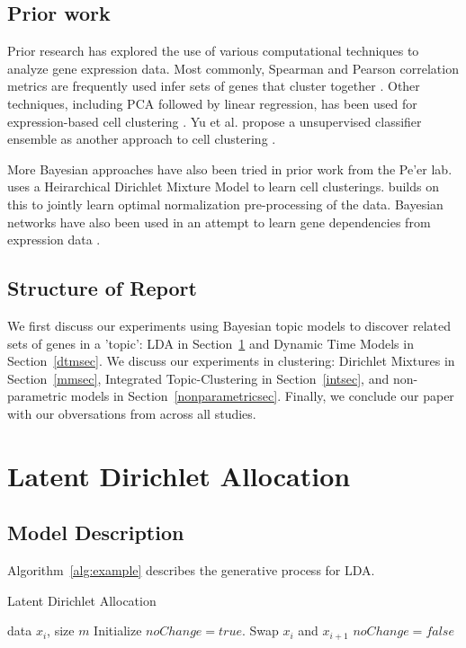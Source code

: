 \documentclass{article}
\begin{document}
\subsection{Prior work}
Prior research has explored the use of various computational techniques to analyze gene expression data. Most commonly, Spearman and Pearson correlation metrics are frequently used infer sets of genes that cluster together \cite{profiling, nature}. Other techniques, including PCA followed by linear regression, has been used for expression-based cell clustering \cite{transcriptomics}. Yu et al. propose a unsupervised classifier ensemble as another approach to cell clustering \cite{consensus}. 

More Bayesian approaches have also been tried in prior work from the Pe'er lab. \cite{bayesge2} uses a Heirarchical Dirichlet Mixture Model to learn cell clusterings. \cite{bayesge1} builds on this to jointly learn optimal normalization pre-processing of the data. Bayesian networks have also been used in an attempt to learn gene dependencies from expression data \cite{bayesge3}.

\subsection{Structure of Report}
    We first discuss our experiments using Bayesian topic models to discover related sets of genes in a 'topic': LDA in Section~\ref{ldasec} and Dynamic Time Models in Section~\ref{dtmsec}. We discuss our experiments in clustering: Dirichlet Mixtures in Section~\ref{mmsec}, Integrated Topic-Clustering in Section~\ref{intsec}, and non-parametric models in Section~\ref{nonparametricsec}. Finally, we conclude our paper with our obversations from across all studies. 

\section{Latent Dirichlet Allocation} 
\label{ldasec}
\subsection{Model Description} 
    Algorithm~\ref{alg:example} describes the generative process for LDA.

    \begin{algorithm}[tb]
       \caption{Latent Dirichlet Allocation}
       \label{alg:example}
    \begin{algorithmic}
        data $x_i$, size $m$
       \REPEAT
       \STATE Initialize $noChange = true$.
       \STATE Swap $x_i$ and $x_{i+1}$
       \STATE $noChange = false$
       \ENDIF
       \ENDFOR
    \end{algorithmic}
    \end{algorithm}
\end{document}
